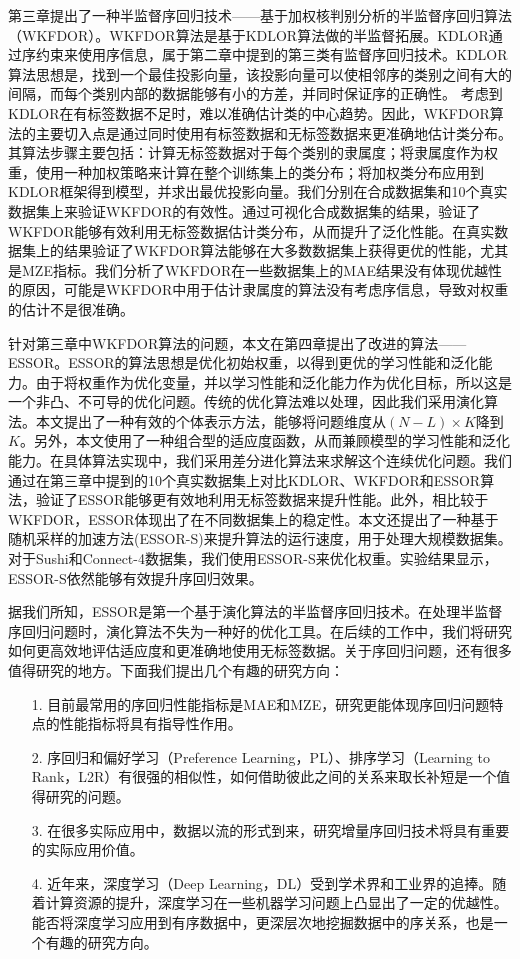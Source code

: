 第三章提出了一种半监督序回归技术——基于加权核判别分析的半监督序回归算法（WKFDOR）。WKFDOR算法是基于KDLOR算法做的半监督拓展。KDLOR通过序约束来使用序信息，属于第二章中提到的第三类有监督序回归技术。KDLOR算法思想是，找到一个最佳投影向量，该投影向量可以使相邻序的类别之间有大的间隔，而每个类别内部的数据能够有小的方差，并同时保证序的正确性。
考虑到KDLOR在有标签数据不足时，难以准确估计类的中心趋势。因此，WKFDOR算法的主要切入点是通过同时使用有标签数据和无标签数据来更准确地估计类分布。其算法步骤主要包括：计算无标签数据对于每个类别的隶属度；将隶属度作为权重，使用一种加权策略来计算在整个训练集上的类分布；将加权类分布应用到KDLOR框架得到模型，并求出最优投影向量。我们分别在合成数据集和10个真实数据集上来验证WKFDOR的有效性。通过可视化合成数据集的结果，验证了WKFDOR能够有效利用无标签数据估计类分布，从而提升了泛化性能。在真实数据集上的结果验证了WKFDOR算法能够在大多数数据集上获得更优的性能，尤其是MZE指标。我们分析了WKFDOR在一些数据集上的MAE结果没有体现优越性的原因，可能是WKFDOR中用于估计隶属度的算法没有考虑序信息，导致对权重的估计不是很准确。

针对第三章中WKFDOR算法的问题，本文在第四章提出了改进的算法——ESSOR。ESSOR的算法思想是优化初始权重，以得到更优的学习性能和泛化能力。由于将权重作为优化变量，并以学习性能和泛化能力作为优化目标，所以这是一个非凸、不可导的优化问题。传统的优化算法难以处理，因此我们采用演化算法。本文提出了一种有效的个体表示方法，能够将问题维度从\((N-L)\times K\)降到\(K\)。另外，本文使用了一种组合型的适应度函数，从而兼顾模型的学习性能和泛化能力。在具体算法实现中，我们采用差分进化算法来求解这个连续优化问题。我们通过在第三章中提到的10个真实数据集上对比KDLOR、WKFDOR和ESSOR算法，验证了ESSOR能够更有效地利用无标签数据来提升性能。此外，相比较于WKFDOR，ESSOR体现出了在不同数据集上的稳定性。本文还提出了一种基于随机采样的加速方法(ESSOR-S)来提升算法的运行速度，用于处理大规模数据集。对于Sushi和Connect-4数据集，我们使用ESSOR-S来优化权重。实验结果显示，ESSOR-S依然能够有效提升序回归效果。

据我们所知，ESSOR是第一个基于演化算法的半监督序回归技术。在处理半监督序回归问题时，演化算法不失为一种好的优化工具。在后续的工作中，我们将研究如何更高效地评估适应度和更准确地使用无标签数据。关于序回归问题，还有很多值得研究的地方。下面我们提出几个有趣的研究方向：
\begin{enumerate}
\item[1.]目前最常用的序回归性能指标是MAE和MZE，研究更能体现序回归问题特点的性能指标将具有指导性作用。
\item[2.]序回归和偏好学习（Preference Learning，PL）、排序学习（Learning to Rank，L2R）有很强的相似性，如何借助彼此之间的关系来取长补短是一个值得研究的问题。
\item[3.]在很多实际应用中，数据以流的形式到来，研究增量序回归技术将具有重要的实际应用价值。
\item[4.]近年来，深度学习（Deep Learning，DL）受到学术界和工业界的追捧。随着计算资源的提升，深度学习在一些机器学习问题上凸显出了一定的优越性。能否将深度学习应用到有序数据中，更深层次地挖掘数据中的序关系，也是一个有趣的研究方向。
\end{enumerate}


